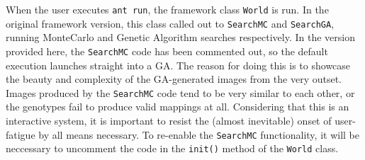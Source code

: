 \documentclass{article}
\begin{document}
When the user executes \texttt{ant run}, the framework class \texttt{World} is run. In the original 
framework version, this class called out to \texttt{SearchMC} and \texttt{SearchGA}, running MonteCarlo
and Genetic Algorithm searches respectively. In the version provided here, the \texttt{SearchMC} code
has been commented out, so the default execution launches straight into a GA. The reason for doing this
is to showcase the beauty and complexity of the GA-generated images from the very outset. Images produced
by the \texttt{SearchMC} code tend to be very similar to each other, or the genotypes fail to produce valid 
mappings at all. Considering that this is an interactive system, it is important to resist the (almost 
inevitable) onset of user-fatigue by all means necessary. To re-enable the \texttt{SearchMC} functionality,
it will be neccessary to uncomment the code in the \texttt{init()} method of the \texttt{World} class.
\end{document}
